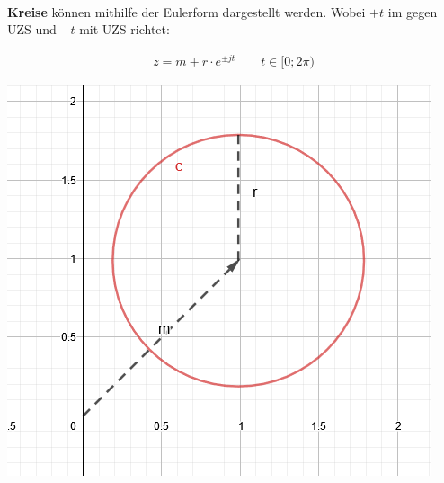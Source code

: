 ~\\
\begin{minipage}{\columnwidth}	
	\noindent\textbf{Kreise} können mithilfe der Eulerform dargestellt werden. Wobei $+t$ im gegen UZS und $-t$ mit UZS richtet:
	
	\begin{minipage}{0.6\textwidth}
		\begin{align*}
			z = m + r \cdot e ^{\pm jt} \qquad t \in [0; 2\pi)
		\end{align*}
	\end{minipage}%
	\begin{minipage}{0.4\textwidth}
		\includegraphics[width=\columnwidth]{Images/parameter_kreis}
	\end{minipage}
\end{minipage}

